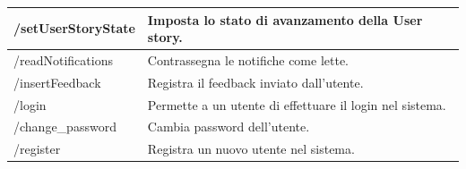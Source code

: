 \documentclass{article}
\begin{document}
\begin{center}
\begin{tabular}{|P{7cm}| P{10cm}|}
\hline
{}
/setUserStoryState & Imposta lo stato di avanzamento della User story. \\
\hline
{}
/readNotifications & Contrassegna le notifiche come lette. \\
\hline
{}
/insertFeedback & Registra il feedback inviato dall'utente. \\
\hline
{}
/login & Permette a un utente di effettuare il login nel sistema. \\
\hline
{}
/change\_password & Cambia password dell'utente. \\
\hline
{}
/register & Registra un nuovo utente nel sistema. \\
\hline
\end{tabular}
\label{tab:lambda}
\end{center}
\end{document}
